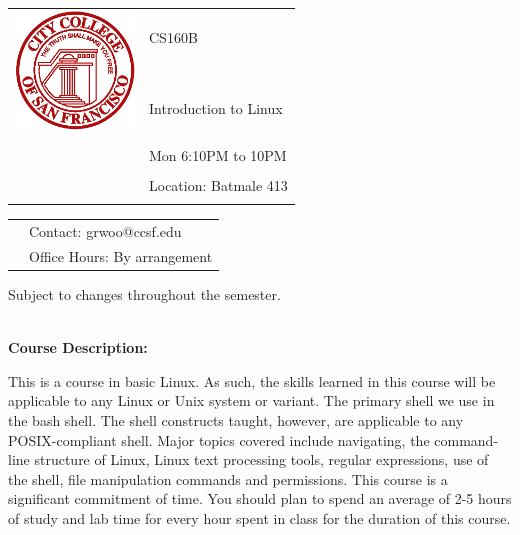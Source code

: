 \documentclass[11pt]{article}
\begin{document}
\begin{tabular}{ l l }
  \multirow{3}{*}{\includegraphics[height=1.25in,width=1.25in]{logo_ccsf.png}} & \LARGE CS160B \\\\
                                                                             & \LARGE Introduction to Linux \\\\
  & \LARGE Mon 6:10PM to 10PM \\\\
  & \LARGE Location: Batmale 413\\\\
\end{tabular}
\vspace{10mm}

\begin{tabular}{ l l }
  & \large Contact: grwoo@ccsf.edu \\
  & \large Office Hours: By arrangement\\
\end{tabular}
\vspace{5mm}
\begin{center} Subject to changes throughout the semester.\\
\end{center}

\textbf {\large \\ Course Description:}

This is a course in basic Linux. As such, the skills learned in this course
will be applicable to any Linux or Unix system or variant. The primary shell we
use in the bash shell. The shell constructs taught, however, are applicable to
any POSIX-compliant shell. Major topics covered include navigating, the
command-line structure of Linux, Linux text processing tools, regular
expressions, use of the shell, file manipulation commands and permissions.
This course is a significant commitment of time. You should plan to spend an
average of 2-5 hours of study and lab time for every hour spent in class for
the duration of this course.\\
\end{document}
